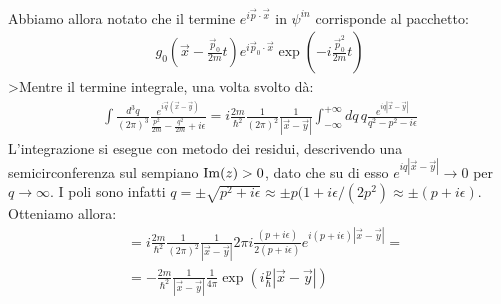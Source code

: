 \documentclass[../../FisicaTeorica.tex]{subfiles}
\begin{document}
Abbiamo allora notato che il termine $e^{i\vec{p}\cdot \vec{x}}$ in $\psi^{in}$ corrisponde al pacchetto:
\begin{align*}
g_0\left(\vec{x}-\frac{\vec{p}_0}{2m}t\right) e^{i\vec{p}_0\cdot \vec{x}} \exp \left(-i\frac{\vec{p}_0^2}{2m}t \right)
\end{align*}
>Mentre il termine integrale, una volta svolto dà:
\begin{align*}
\int \frac{d^3q}{(2\pi)^3} \frac{e^{i\vec{q}(\vec{x}-\vec{y})}}{\displaystyle \frac{p^2}{2m}-\frac{q^2}{2m}+i\epsilon} = i\frac{2m}{\hbar^2} \frac{1}{(2\pi)^2} \frac{1}{|\vec{x}-\vec{y}|} \int_{-\infty}^{+\infty} dq\, q \frac{e^{iq|\vec{x}-\vec{y}|}}{q^2-p^2-i\epsilon}
\end{align*}
L'integrazione si esegue con metodo dei residui, descrivendo una semicirconferenza sul sempiano $\operatorname{Im}(z)>0$, dato che su di esso $e^{iq|\vec{x}-\vec{y}|}\to 0$ per $q\to\infty$. I poli sono infatti $q=\pm \sqrt{p^2 + i\epsilon} \approx \pm p(1+i\epsilon/(2p^2) \approx \pm (p+i\epsilon)$. Otteniamo allora:
\begin{align*}
&= i\frac{2m}{\hbar^2}\frac{1}{(2\pi)^2}\frac{1}{|\vec{x}-\vec{y}|}2\pi i \frac{(p+i\epsilon)}{2(p+i\epsilon)} e^{i(p+i\epsilon)|\vec{x}-\vec{y}|}=\\
&= -\frac{2m}{\hbar^2}\frac{1}{|\vec{x}-\vec{y}|} \frac{1}{4\pi} \exp\left(i\frac{p}{\hbar}|\vec{x}-\vec{y}|\right)
\end{align*}
\end{document}
